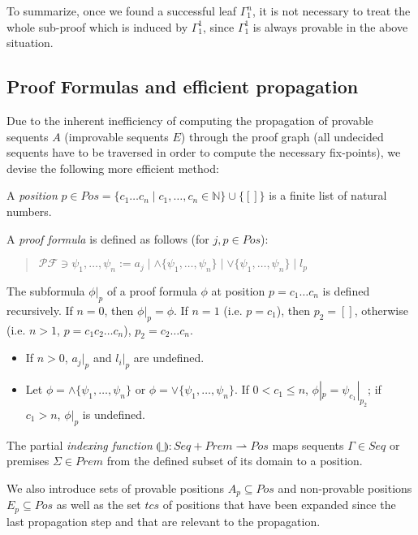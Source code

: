 \documentclass{llncs}
\newcommand{\ind}[1]{\llparenthesis #1 \rrparenthesis}
\begin{document}
To summarize, once we found a successful leaf $\Gamma^n_1$, it is not necessary to treat the whole sub-proof
which is induced by $\Gamma^1_1$, since $\Gamma^1_1$ is always provable in the above situation.

\subsection{Proof Formulas and efficient propagation}

Due to the inherent inefficiency of computing the propagation of provable
sequents $A$ (improvable sequents $E$) through the proof graph (all undecided
sequents have to be traversed in order to compute the necessary fix-points),
we devise the following more efficient method:

\begin{definition}
A \emph{position} $p\in Pos=\{c_1\ldots c_n\mid c_1,\ldots,c_n\in\mathbb{N}\}\cup\{[]\}$ is a finite
list of natural numbers.

A \emph{proof formula} is defined as follows (for $j,p\in Pos$):
\begin{quote}
$\mathcal{PF} \ni \psi_1,\ldots,\psi_n := a_j \mid \wedge \{\psi_1,\ldots,\psi_n\} \mid \vee \{\psi_1,\ldots,\psi_n\} \mid l_p$
\end{quote}

The subformula $\phi|_p$ of a proof formula $\phi$ at position $p=c_1\ldots c_n$ is defined
recursively. If $n=0$, then $\phi|_p=\phi$. If $n=1$ (i.e. $p=c_1$), then $p_2=[]$, otherwise
(i.e. $n>1$, $p=c_1c_2\ldots c_n$), $p_2=c_2\ldots c_n$.
\begin{itemize}
\item If $n>0$, $a_j|_p$ and $l_i|_p$ are undefined.
\item Let $\phi=\wedge \{\psi_1,\ldots,\psi_n\}$ or $\phi=\vee \{\psi_1,\ldots,\psi_n\}$. If $0<c_1\leq n$,
$\phi|_p=\psi_{c_1}|_{p_2}$; if $c_1>n$, $\phi|_p$ is undefined.
\end{itemize}

The partial \emph{indexing function} $\ind{\_}:Seq + Prem \rightharpoonup Pos$
maps sequents $\Gamma\in Seq$ or premises $\Sigma\in Prem$ from the defined
subset of its domain to a position.

We also introduce sets of provable positions $A_p\subseteq Pos$ and non-provable
positions $E_p\subseteq Pos$ as well as the set $tcs$ of positions that have been
expanded since the last propagation step and that are relevant to the propagation.
\end{definition}
\end{document}
